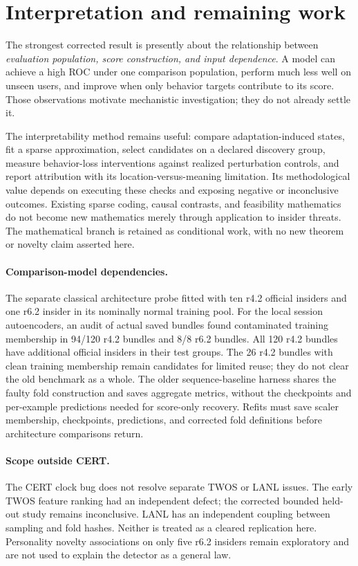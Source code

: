 \section{Interpretation and remaining work}
\label{sec:discussion}
The strongest corrected result is presently about the relationship between
\emph{evaluation population, score construction, and input dependence}. A model
can achieve a high ROC under one comparison population, perform much less well
on unseen users, and improve when only behavior targets contribute to its
score. Those observations motivate mechanistic investigation; they do not
already settle it.

The interpretability method remains useful: compare adaptation-induced states,
fit a sparse approximation, select candidates on a declared discovery group,
measure behavior-loss interventions against realized perturbation controls,
and report attribution with its location-versus-meaning limitation. Its
methodological value depends on executing these checks and exposing negative
or inconclusive outcomes. Existing sparse coding, causal contrasts, and
feasibility mathematics do not become new mathematics merely through application
to insider threats. The mathematical branch is retained as conditional work,
with no new theorem or novelty claim asserted here.

\paragraph{Comparison-model dependencies.}
The separate classical architecture probe fitted with ten r4.2 official
insiders and one r6.2 insider in its nominally normal training pool. For the
local session autoencoders, an audit of actual saved bundles found contaminated
training membership in 94/120 r4.2 bundles and 8/8 r6.2 bundles. All 120 r4.2
bundles have additional official insiders in their test groups. The 26 r4.2
bundles with clean training membership remain candidates for limited reuse;
they do not clear the old benchmark as a whole. The older sequence-baseline
harness shares the faulty fold construction and saves aggregate metrics,
without the checkpoints and per-example predictions needed for score-only
recovery. Refits must save scaler membership, checkpoints, predictions, and
corrected fold definitions before architecture comparisons return.

\paragraph{Scope outside CERT.}
The CERT clock bug does not resolve separate TWOS or LANL issues. The early
TWOS feature ranking had an independent defect; the corrected bounded held-out
study remains inconclusive. LANL has an independent coupling between sampling
and fold hashes. Neither is treated as a cleared replication here. Personality
novelty associations on only five r6.2 insiders remain exploratory and are not
used to explain the detector as a general law.

